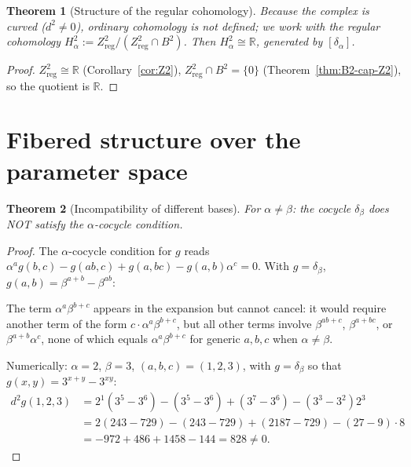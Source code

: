 \documentclass[11pt,a4paper]{article}
\theoremstyle{plain}
\newtheorem{theorem}{Theorem}[section]
\theoremstyle{definition}
\theoremstyle{remark}
\newcommand{\RR}{\mathbb{R}}
\begin{document}
\begin{theorem}[Structure of the regular cohomology]
\label{thm:H2}
Because the complex is curved ($d^2 \neq 0$), ordinary cohomology is
not defined; we work with the \emph{regular cohomology}
$H^2_\alpha := Z^2_{\mathrm{reg}} / (Z^2_{\mathrm{reg}} \cap B^2)$.
Then $H^2_\alpha \cong \RR$, generated by $[\delta_\alpha]$.
\end{theorem}

\begin{proof}
$Z^2_{\mathrm{reg}} \cong \RR$ (Corollary~\ref{cor:Z2}), 
$Z^2_{\mathrm{reg}} \cap B^2 = \{0\}$ 
(Theorem~\ref{thm:B2-cap-Z2}), so the quotient is $\RR$.
\end{proof}

\section{Fibered structure over the parameter space}
\label{sec:fibered}

\begin{theorem}[Incompatibility of different bases]
\label{thm:fibered}
For $\alpha \neq \beta$: the cocycle $\delta_\beta$ does NOT satisfy 
the $\alpha$-cocycle condition.
\end{theorem}

\begin{proof}
The $\alpha$-cocycle condition for $g$ reads 
$\alpha^a g(b,c) - g(ab,c) + g(a,bc) - g(a,b)\alpha^c = 0$. With 
$g = \delta_\beta$, $g(a,b) = \beta^{a+b} - \beta^{ab}$:

The term $\alpha^a \beta^{b+c}$ appears in the expansion but cannot 
cancel: it would require another term of the form $c \cdot 
\alpha^a \beta^{b+c}$, but all other terms involve 
$\beta^{ab+c}$, $\beta^{a+bc}$, or $\beta^{a+b}\alpha^c$, none of 
which equals $\alpha^a\beta^{b+c}$ for generic $a, b, c$ when 
$\alpha \neq \beta$.

Numerically: $\alpha = 2$, $\beta = 3$, $(a,b,c) = (1,2,3)$, with
$g = \delta_\beta$ so that $g(x,y) = 3^{x+y} - 3^{xy}$:
\begin{align*}
d^2 g(1,2,3) &= 2^1(3^5 - 3^6) - (3^5 - 3^6) + (3^7 - 3^6)
- (3^3 - 3^2)2^3 \\
&= 2(243 - 729) - (243 - 729) + (2187 - 729) - (27 - 9)\cdot 8 \\
&= -972 + 486 + 1458 - 144 = 828 \neq 0.
\end{align*}
\end{proof}
\end{document}
